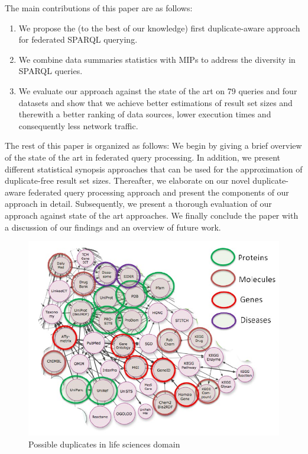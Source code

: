 \documentclass{sig-alternate}  %
\begin{document}
The main contributions of this paper are as follows:
\begin{enumerate}
\item We propose the (to the best of our knowledge) first duplicate-aware approach for federated SPARQL querying.
\item We combine data summaries statistics with MIPs to address the diversity in SPARQL queries.
\item We evaluate our approach against the state of the art on 79 queries and four datasets and show that we achieve better estimations of result set sizes and therewith a better ranking of data sources, lower execution times and consequently less network traffic.
\end{enumerate}
%
The rest of this paper is organized as follows: 
We begin by giving a brief overview of the state of the art in federated query processing.
In addition, we present different statistical synopsis approaches that can be used for the approximation of duplicate-free result set sizes. 
Thereafter, we elaborate on our novel duplicate-aware federated query processing approach and present the components of our approach in detail.
Subsequently, we present a thorough evaluation of our approach against state of the art approaches.
We finally conclude the paper with a discussion of our findings and an overview of future work.
\begin{figure}
\centering
\includegraphics[scale=0.70]{img/possibleDuplicates} 
\caption{Possible duplicates in life sciences domain}
\label{fig:datasets}
\end{figure}
\end{document}
